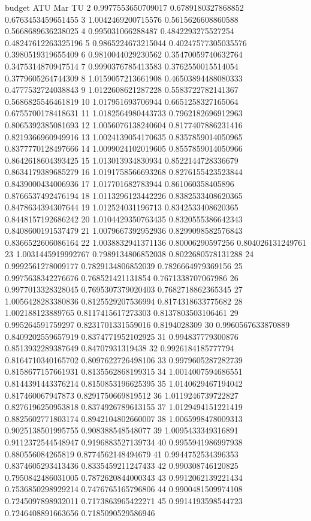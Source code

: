 budget	ATU	Mar	TU
2	0.9977553650709017	0.6789180327868852	0.6763453459651455
3	1.0042469200715576	0.5615626608860588	0.5668689636238025
4	0.995031066288487	0.4842293275527254	0.48247612263325196
5	0.9865224673215044	0.40247577305035576	0.3980519319655409
6	0.9810044029230562	0.35470059740632764	0.3475314870947514
7	0.9990376785413583	0.3762550015514054	0.3779605264744309
8	1.0159057213661908	0.46503894488080333	0.4777532724038843
9	1.0122608621287228	0.5583722782141367	0.5686825546461819
10	1.017951693706944	0.6651258327165064	0.6755700178418631
11	1.0182564980443733	0.7962182696912963	0.8065392385081693
12	1.0056076138240604	0.8177407886231416	0.8219366960949916
13	1.0024139054170635	0.8357859014050965	0.8377770128497666
14	1.0099024102019605	0.8557859014050966	0.8642618604393425
15	1.013013934830934	0.8522144728336679	0.8634179389685279
16	1.0191758566693268	0.8276155423523844	0.8439000434006936
17	1.017701682783944	0.861060358405896	0.8766537492476194
18	1.0113296123442226	0.8382533408620365	0.8478634394307644
19	1.012524031196713	0.8342533408620365	0.8448157192686242
20	1.0104429350763435	0.8320555386642343	0.8408600191537479
21	1.0079667392952936	0.8299098582576843	0.8366522606086164
22	1.0038832941371136	0.80006290597256	0.804026131249761
23	1.0031445919992767	0.7989134806852038	0.8022680578131288
24	0.9992561278009177	0.7829134806852039	0.7826664979369156
25	0.9975638342276676	0.768521421131854	0.7671338707067986
26	0.9977013328328045	0.7695307379020403	0.7682718862365345
27	1.0056428283380836	0.8125529207536994	0.8174318633775682
28	1.002188123889765	0.8117415617273303	0.8137803503106461
29	0.995264591759297	0.8231701331559016	0.8194028309
30	0.9960567633870889	0.8409202559657919	0.8374771952102925
31	0.994837779300876	0.8513932289387649	0.84707931319438
32	0.9926184185777794	0.8164710340165702	0.8097622726498106
33	0.9979605287282739	0.8158677157661931	0.8135562868199315
34	1.0014007594686551	0.8144391443376214	0.8150853196625395
35	1.0140629467194042	0.817460067947873	0.8291750669819512
36	1.0119246739722827	0.8276196250953818	0.8374926789613155
37	1.0129494151221419	0.8825602771803174	0.8942104802660007
38	1.0065998478009313	0.9025138501995755	0.908388548548077
39	1.0095433349316891	0.9112372544548947	0.9196883527139734
40	0.9955941986997938	0.880556084265819	0.8774562148494679
41	0.9944752534396353	0.8374605293413436	0.8335459211247433
42	0.990308746120825	0.7950842486031005	0.7872620844000343
43	0.9912062139221434	0.7536850298929214	0.7476765165796806
44	0.9900481509974108	0.7245097898932011	0.7173863965422271
45	0.9914193598544723	0.7246408891663656	0.7185090529586946
